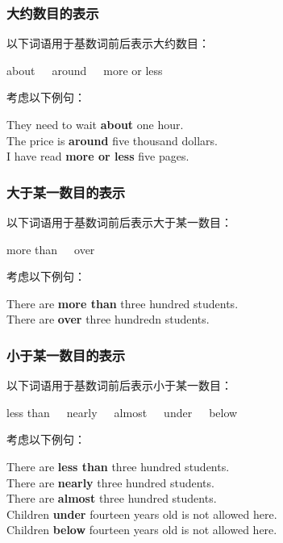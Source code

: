 \documentclass[UTF8]{ctexart}
\begin{document}
\subsubsection{大约数目的表示}
    以下词语用于基数词前后表示大约数目：
    \begin{center}
        \ttfamily
        about~~~around~~~more or less\\[6mm]
    \end{center}
    考虑以下例句：
    \begin{center}
        \large\ttfamily
        They need to wait \textbf{about} one hour.\\[3mm]
        The price is \textbf{around} five thousand dollars.\\[3mm]
        I have read \textbf{more or less} five pages.
    \end{center}\vspace{10pt}

\subsubsection{大于某一数目的表示}
    以下词语用于基数词前后表示大于某一数目：
    \begin{center}
        \ttfamily
        more than~~~over\\[6mm]
    \end{center}
    考虑以下例句：
    \begin{center}
        \large\ttfamily
        There are \textbf{more than} three hundred students.\\[3mm]
        There are \textbf{over} three hundredn students.
    \end{center}\vspace{10pt}

\subsubsection{小于某一数目的表示}
    以下词语用于基数词前后表示小于某一数目：
    \begin{center}
        \ttfamily
        less than~~~nearly~~~almost~~~under~~~below\\[6mm]
    \end{center}
    考虑以下例句：
    \begin{center}
        \large\ttfamily
        There are \textbf{less than} three hundred students.\\[3mm]
        There are \textbf{nearly} three hundred students.\\[3mm]
        There are \textbf{almost} three hundred students.\\[3mm]
        Children \textbf{under} fourteen years old is not allowed here.\\[3mm]
        Children \textbf{below} fourteen years old is not allowed here.
    \end{center}
\end{document}
